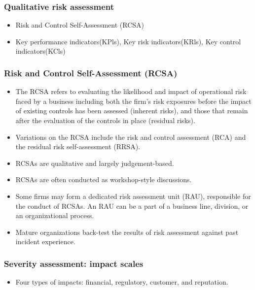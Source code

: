 \subsubsection{Qualitative risk assessment}
\begin{itemize}
\item Risk and Control Self-Assessment (RCSA)
\item  Key performance indicators(KPls), Key risk indicators(KRls), Key control indicators(KCls)

\end{itemize}




\subsubsection{Risk and Control Self-Assessment (RCSA)}
\begin{itemize}
\item The RCSA refers to evaluating the likelihood and impact of operational risk faced by a business including both the firm's risk exposures before the impact of existing controls has been assessed (inherent risks), and those that remain after the evaluation of the controls in place (residual risks).
\item  Variations on the RCSA include the risk and control assessment (RCA) and the residual risk self-assessment (RRSA).
\item  RCSAs are qualitative and largely judgement-based.
\item  RCSAs are often conducted as workshop-style discussions.
\item  Some firms may form a dedicated risk assessment unit (RAU), responsible for the conduct of RCSAs. An RAU can be a part of a business line, division, or an organizational process.
\item  Mature organizations back-test the results of risk assessment against past incident experience.
\end{itemize}


\subsubsection{Severity assessment: impact scales}
\begin{itemize}
\item Four types of impacts: financial, regulatory, customer, and reputation.
\end{itemize}


